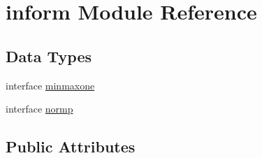 \hypertarget{classinform}{\section{inform Module Reference}
\label{classinform}
}
\subsection*{Data Types}
\begin{DoxyCompactItemize}
\item 
interface \hyperlink{interfaceinform_1_1minmaxone}{minmaxone}
\item 
interface \hyperlink{interfaceinform_1_1normp}{normp}
\end{DoxyCompactItemize}
\subsection*{Public Attributes}
